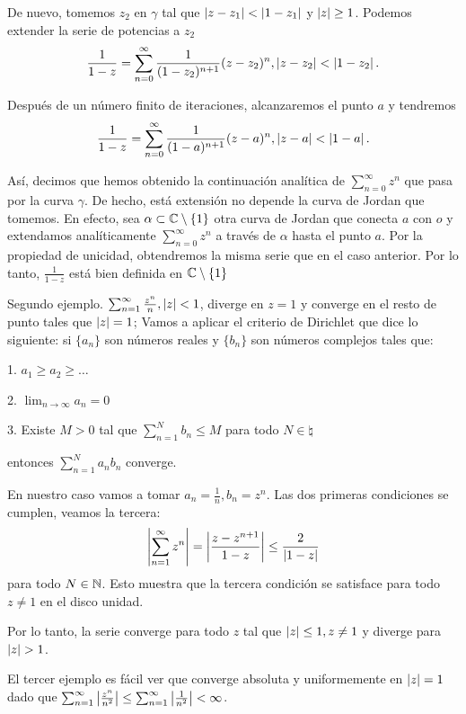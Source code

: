 De nuevo, tomemos $z_2$ en $\gamma$ tal que $\left\lvert z - z_1\right\rvert < \left\lvert1 - z_1\right\rvert$ y $\left\lvert z\right\rvert \geq 1$. Podemos extender la serie de potencias a $z_2$
\begin{equation*}
    \frac{1}{1-z} = \sum_{n=0}^{\infty} \frac{1}{(1 - z_2)^{n+1}} (z - z_2)^n , \left\lvert z - z_2\right\rvert < \left\lvert1 - z_2\right\rvert.
\end{equation*}

Después de un número finito de iteraciones, alcanzaremos el punto $a$ y tendremos
\begin{equation*}
    \frac{1}{1-z} = \sum_{n=0}^{\infty} \frac{1}{(1 - a)^{n+1}} (z - a)^n , \left\lvert z - a\right\rvert < \left\lvert1 - a\right\rvert.
\end{equation*}

Así, decimos que hemos obtenido la continuación analítica de $\sum_{n=0}^{\infty} z^n$ que pasa por la curva $\gamma$. De hecho, está extensión no depende la curva de Jordan que tomemos. En efecto, sea $\alpha \subset \mathbb{C} \setminus \{1\}$ otra curva de Jordan que conecta $a$ con $o$ y extendamos analíticamente $\sum_{n=0}^{\infty} z^n$ a través de $\alpha$ hasta el punto $a$. Por la propiedad de unicidad, obtendremos la misma serie que en el caso anterior. Por lo tanto, $\frac{1}{1 - z}$ está bien definida en $\mathbb{C} \setminus \{1\}$ \\ \par


Segundo ejemplo. $\sum_{n=1}^{\infty} \frac{z^n}{n}, \left\lvert z\right\rvert < 1$, diverge en $z = 1$  y converge en el resto de punto tales que $\left\lvert z\right\rvert = 1$;
Vamos a aplicar el criterio de Dirichlet que dice lo siguiente: si $\{a_n\}$ son números reales y $\{b_n\}$ son números complejos tales que:

1. $a_1 \geq a_2 \geq \dots$

2. $\lim_{n \rightarrow \infty} a_n = 0$

3. Existe $M > 0$ tal que $\sum_{n=1}^{N} b_n \leq M$ para todo $N \in \natural$

entonces $\sum_{n=1}^{N} a_nb_n$ converge.

En nuestro caso vamos a tomar $a_n = \frac{1}{n}, b_n = z^n$. Las dos primeras condiciones se cumplen, veamos la tercera:
\begin{equation*}
\left\lvert\sum_{n=1}^{\infty} z^n\right\rvert = \left\lvert\frac{z - z^{n+1}}{1 - z}\right\rvert \leq \frac{2}{\left\lvert1 - z\right\rvert}
\end{equation*}
para todo $N \in \mathbb{N}$. Esto muestra que la tercera condición se satisface para todo $z \not = 1$ en el disco unidad.

Por lo tanto, la serie converge para todo $z$ tal que $\left\lvert z\right\rvert \leq 1, z \not = 1$ y diverge para $\left\lvert z\right\rvert > 1$. \\ \par


El tercer ejemplo es fácil ver que converge absoluta y uniformemente en $\left\lvert z\right\rvert = 1$ dado que $\sum_{n=1}^{\infty} \left\lvert\frac{z^n}{n^2}\right\rvert \leq \sum_{n=1}^{\infty} \left\lvert\frac{1}{n^2}\right\rvert < \infty$.



